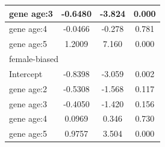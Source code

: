 \documentclass{article}
\begin{document}
\begin{table}[H]
\begin{tabular}{l |c | c| c}
        \hline
        gene age:3 & -0.6480 & -3.824 & 0.000 \\
        \hline
        gene age:4 & -0.0466 & -0.278 & 0.781 \\
        \hline
        gene age:5 &  1.2009 &  7.160 & 0.000 \\
        \hline
        \hline
        \multicolumn{4}{l}{female-biased}\\
        \hline
        Intercept & -0.8398 & -3.059 & 0.002 \\
        \hline
        gene age:2 & -0.5308 & -1.568 & 0.117 \\
        \hline
        gene age:3 & -0.4050 & -1.420 & 0.156 \\
        \hline
        gene age:4 &  0.0969 &  0.346 & 0.730 \\
        \hline
        gene age:5 &  0.9757 &  3.504 & 0.000 \\
        \hline
    \end{tabular}

    \hspace{1cm}


\end{table}
\end{document}
